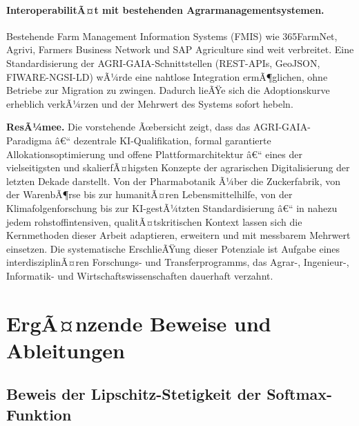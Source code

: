 ﻿\documentclass[12pt,a4paper]{article}
\theoremstyle{plain}
\theoremstyle{definition}
\begin{document}
	\paragraph{InteroperabilitÃ¤t mit bestehenden Agrarmanagementsystemen.}
	Bestehende Farm Management Information Systems (FMIS) wie
	365FarmNet, Agrivi, Farmers Business Network und SAP Agriculture
	sind weit verbreitet. Eine Standardisierung der AGRI-GAIA-Schnittstellen
	(REST-APIs, GeoJSON, FIWARE-NGSI-LD) wÃ¼rde eine nahtlose
	Integration ermÃ¶glichen, ohne Betriebe zur Migration zu zwingen.
	Dadurch lieÃŸe sich die Adoptionskurve erheblich verkÃ¼rzen und
	der Mehrwert des Systems sofort hebeln.

	\bigskip
	\noindent
	\textbf{ResÃ¼mee.}
	Die vorstehende Ãœbersicht zeigt, dass das AGRI-GAIA-Paradigma â€“
	dezentrale KI-Qualifikation, formal garantierte Allokationsoptimierung
	und offene Plattformarchitektur â€“ eines der vielseitigsten und
	skalierfÃ¤higsten Konzepte der agrarischen Digitalisierung der letzten
	Dekade darstellt. Von der Pharmabotanik Ã¼ber die Zuckerfabrik, von
	der WarenbÃ¶rse bis zur humanitÃ¤ren Lebensmittelhilfe, von der
	Klimafolgenforschung bis zur KI-gestÃ¼tzten Standardisierung â€“
	in nahezu jedem rohstoffintensiven, qualitÃ¤tskritischen Kontext
	lassen sich die Kernmethoden dieser Arbeit adaptieren, erweitern und
	mit messbarem Mehrwert einsetzen. Die systematische ErschlieÃŸung
	dieser Potenziale ist Aufgabe eines interdisziplinÃ¤ren Forschungs-
	und Transferprogramms, das Agrar-, Ingenieur-, Informatik-
	und Wirtschaftswissenschaften dauerhaft verzahnt.

	\appendix
	\section{ErgÃ¤nzende Beweise und Ableitungen}
	
	\subsection{Beweis der Lipschitz-Stetigkeit der Softmax-Funktion}
	
\end{document}
